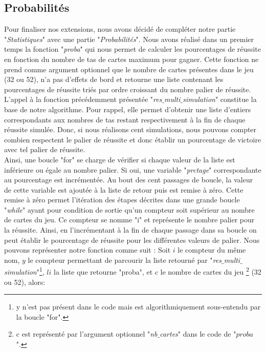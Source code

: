 \documentclass[10pt,a4paper,french,titlepage]{article}
\theoremstyle{definition}
\begin{document}
\subsection{Probabilités}
Pour finaliser nos extensions, nous avons décidé de compléter notre partie "\textit{Statistiques}" avec une partie "\textit{Probabilités}". Nous avons réalisé dans un premier temps la fonction "\textit{proba}" qui nous permet de calculer les pourcentages de réussite en fonction du nombre de tas de cartes maximum pour gagner. Cette fonction ne prend comme argument optionnel que le nombre de cartes présentes dans le jeu (32 ou 52), n'a pas d'effets de bord et retourne une liste contenant les pourcentages de réussite triés par ordre croissant du nombre palier de réussite. L'appel à la fonction précédemment présentée "\textit{res$\_$multi$\_$simulation}" constitue la base de notre algorithme. Pour rappel, elle permet d'obtenir une liste d'entiers correspondants aux nombres de tas restant respectivement à la fin de chaque réussite simulée.
Donc, si nous réalisons cent simulations, nous pouvons compter combien respectent le palier de réussite et donc établir un pourcentage de victoire avec tel palier de réussite.\\

Ainsi, une boucle "for" se charge de vérifier si chaque valeur de la liste est inférieure ou égale au nombre palier. Si oui, une variable "\textit{prctage}" 
correspondante au pourcentage est incrémentée. Au bout des cent passages de boucle, la valeur de cette variable est ajoutée à la liste de retour puis est remise à zéro. Cette remise à zéro permet l'itération des étapes décrites dans une grande boucle "\textit{while}" ayant pour condition de sortie qu'un compteur soit supérieur au nombre de cartes du jeu. Ce compteur se nomme "i" et représente le nombre palier pour la réussite. Ainsi, en l'incrémentant à la fin de chaque passage dans sa boucle on peut établir le pourcentage de réussite pour les différentes valeurs de palier. Nous pouvons représenter notre fonction comme suit : 
Soit $i$ le compteur du même nom, $y$ le compteur permettant de parcourir la liste retourné par "\textit{res$\_$multi$\_$simulation}"\footnote{y n'est pas présent dans le code mais est algorithmiquement sous-entendu par la boucle "for".}, $li$ la liste que retourne "proba", et $c$ le nombre de cartes du jeu \footnote{c est représenté par l'argument optionnel "\textit{nb$\_$cartes}" dans le code de "$proba$".} (32 ou 52), alors:
\end{document}
